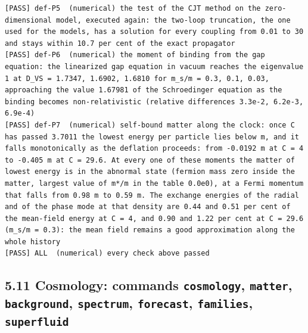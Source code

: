 \documentclass[
  10pt,
]{article}
\begin{document}
\begin{verbatim}
[PASS] def-P5  (numerical) the test of the CJT method on the zero-dimensional model, executed again: the two-loop truncation, the one used for the models, has a solution for every coupling from 0.01 to 30 and stays within 10.7 per cent of the exact propagator
[PASS] def-P6  (numerical) the moment of binding from the gap equation: the linearized gap equation in vacuum reaches the eigenvalue 1 at D_VS = 1.7347, 1.6902, 1.6810 for m_s/m = 0.3, 0.1, 0.03, approaching the value 1.67981 of the Schroedinger equation as the binding becomes non-relativistic (relative differences 3.3e-2, 6.2e-3, 6.9e-4)
[PASS] def-P7  (numerical) self-bound matter along the clock: once C has passed 3.7011 the lowest energy per particle lies below m, and it falls monotonically as the deflation proceeds: from -0.0192 m at C = 4 to -0.405 m at C = 29.6. At every one of these moments the matter of lowest energy is in the abnormal state (fermion mass zero inside the matter, largest value of m*/m in the table 0.0e0), at a Fermi momentum that falls from 0.98 m to 0.59 m. The exchange energies of the radial and of the phase mode at that density are 0.44 and 0.51 per cent of the mean-field energy at C = 4, and 0.90 and 1.22 per cent at C = 29.6 (m_s/m = 0.3): the mean field remains a good approximation along the whole history
[PASS] ALL  (numerical) every check above passed
\end{verbatim}

\hypertarget{cosmology-commands-cosmology-matter-background-spectrum-forecast-families-superfluid}{%
\subsection{\texorpdfstring{5.11 Cosmology: commands \texttt{cosmology},
\texttt{matter}, \texttt{background}, \texttt{spectrum},
\texttt{forecast}, \texttt{families},
\texttt{superfluid}}{5.11 Cosmology: commands cosmology, matter, background, spectrum, forecast, families, superfluid}}\label{cosmology-commands-cosmology-matter-background-spectrum-forecast-families-superfluid}}
\end{document}
